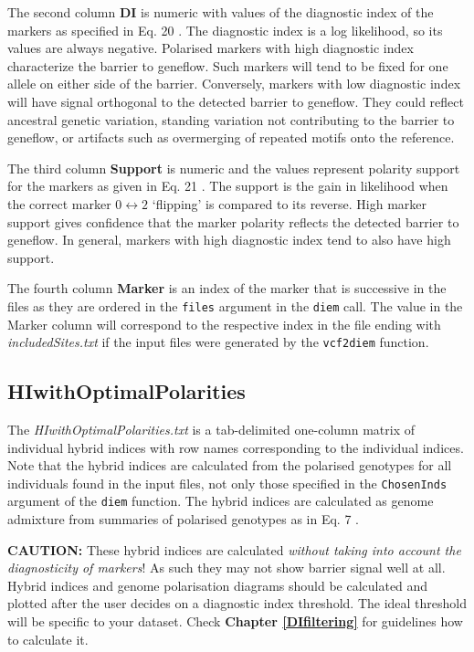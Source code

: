 \documentclass[
]{book}
\begin{document}
The second column \textbf{DI} is numeric with values of the diagnostic index of the markers as specified in Eq. 20 \citep{Baird2023}. The diagnostic index is a log likelihood, so its values are always negative. Polarised markers with high diagnostic index characterize the barrier to geneflow. Such markers will tend to be fixed for one allele on either side of the barrier. Conversely, markers with low diagnostic index will have signal orthogonal to the detected barrier to geneflow. They could reflect ancestral genetic variation, standing variation not contributing to the barrier to geneflow, or artifacts such as overmerging of repeated motifs onto the reference.

The third column \textbf{Support} is numeric and the values represent polarity support for the markers as given in Eq. 21 \citep{Baird2023}. The support is the gain in likelihood when the correct marker \(0 \leftrightarrow 2\) `flipping' is compared to its reverse. High marker support gives confidence that the marker polarity reflects the detected barrier to geneflow. In general, markers with high diagnostic index tend to also have high support.

The fourth column \textbf{Marker} is an index of the marker that is successive in the files as they are ordered in the \texttt{files} argument in the \texttt{diem} call. The value in the Marker column will correspond to the respective index in the file ending with \emph{includedSites.txt} if the input files were generated by the \texttt{vcf2diem} function.

\subsection{HIwithOptimalPolarities}\label{HI}

The \emph{HIwithOptimalPolarities.txt} is a tab-delimited one-column matrix of individual hybrid indices with row names corresponding to the individual indices. Note that the hybrid indices are calculated from the polarised genotypes for all individuals found in the input files, not only those specified in the \texttt{ChosenInds} argument of the \texttt{diem} function. The hybrid indices are calculated as genome admixture from summaries of polarised genotypes as in Eq. 7 \citep{Baird2023}.

\textbf{CAUTION:} These hybrid indices are calculated \emph{without taking into account the diagnosticity of markers}! As such they may not show barrier signal well at all. Hybrid indices and genome polarisation diagrams should be calculated and plotted after the user decides on a diagnostic index threshold. The ideal threshold will be specific to your dataset. Check \textbf{Chapter \ref{DIfiltering}} for guidelines how to calculate it.
\end{document}
